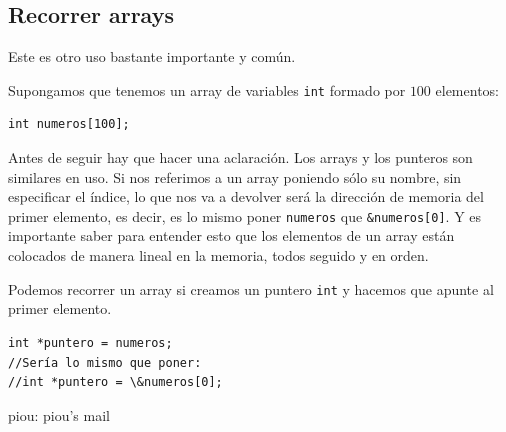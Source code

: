 \documentclass{fennix}
\begin{document}
\subsection{Recorrer arrays}

Este es otro uso bastante importante y común.

Supongamos que tenemos un array de variables \texttt{int} formado por $100$ elementos:

\begin{lstlisting}
int numeros[100];
\end{lstlisting}

Antes de seguir hay que hacer una aclaración. Los arrays y los punteros son similares en uso. Si nos referimos a un array poniendo sólo su nombre, sin especificar el índice, lo que nos va a devolver será la dirección de memoria del primer elemento, es decir, es lo mismo poner \texttt{numeros} que \texttt{\&numeros[0]}. Y es importante saber para entender esto que los elementos de un array están colocados de manera lineal en la memoria, todos seguido y en orden.

Podemos recorrer un array si creamos un puntero \texttt{int} y hacemos que apunte al primer elemento.

\begin{lstlisting}
int *puntero = numeros;
//Sería lo mismo que poner:
//int *puntero = \&numeros[0];
\end{lstlisting}

\begin{colabs}
piou: piou's mail
\end{colabs}
\end{document}
